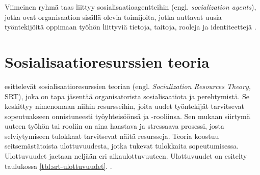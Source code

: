 \documentclass[utf8]{gradu3}
\begin{document}
Viimeinen ryhmä taas liittyy sosialisaatioagentteihin (engl. \textit{socialization agents}), jotka ovat organisaation sisällä olevia toimijoita, jotka auttavat uusia työntekijöitä oppimaan työhön liittyviä tietoja, taitoja, rooleja ja identiteettejä \parencite{saks-gruman-2012}.

\section{Sosialisaatioresurssien teoria}
\label{luku-SRT-teoria}

\textcite{saks-gruman-2012} esittelevät sosialisaatioresurssien teorian (engl. \textit{Socialization Resources Theory,} SRT), joka on tapa jäsentää organisatorista sosialisaatiota ja perehtymistä. Se keskittyy nimenomaan niihin resursseihin, joita uudet työntekijät tarvitsevat sopeutuakseen onnistuneesti työyhteisöönsä ja -rooliinsa. Sen mukaan siirtymä uuteen työhön tai rooliin on aina haastava ja stressaava prosessi, josta selviytymiseen tulokkaat tarvitsevat näitä resursseja. Teoria koostuu seitsemästätoista ulottuvuudesta, jotka tukevat tulokkaita sopeutumisessa. Ulottuvuudet jaetaan neljään eri aikaulottuvuuteen. Ulottuvuudet on esitelty taulukossa \ref{tbl:srt-ulottuvuudet}. \parencite{saks-gruman-2012}.
\end{document}
